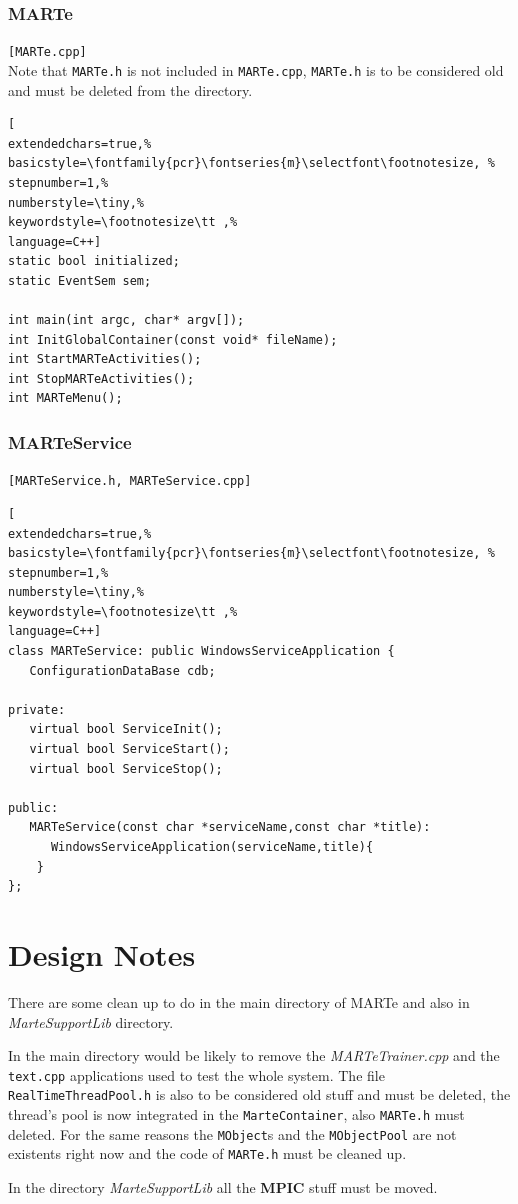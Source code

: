 \subsubsection{MARTe}
\texttt{[MARTe.cpp]}\\
Note that \texttt{MARTe.h} is not included in \texttt{MARTe.cpp}, \texttt{MARTe.h} is to be considered old and must be deleted from the directory.

\begin{lstlisting}[
extendedchars=true,%
basicstyle=\fontfamily{pcr}\fontseries{m}\selectfont\footnotesize, %
stepnumber=1,%
numberstyle=\tiny,%
keywordstyle=\footnotesize\tt ,%
language=C++]
static bool initialized;
static EventSem sem;

int main(int argc, char* argv[]);
int InitGlobalContainer(const void* fileName);
int StartMARTeActivities();
int StopMARTeActivities();
int MARTeMenu();
\end{lstlisting}



\subsubsection{MARTeService}
\texttt{[MARTeService.h, MARTeService.cpp]}\\

\begin{lstlisting}[
extendedchars=true,%
basicstyle=\fontfamily{pcr}\fontseries{m}\selectfont\footnotesize, %
stepnumber=1,%
numberstyle=\tiny,%
keywordstyle=\footnotesize\tt ,%
language=C++]
class MARTeService: public WindowsServiceApplication {
   ConfigurationDataBase cdb;

private:
   virtual bool ServiceInit();
   virtual bool ServiceStart();
   virtual bool ServiceStop();

public:
   MARTeService(const char *serviceName,const char *title):
      WindowsServiceApplication(serviceName,title){
    }
};
\end{lstlisting}



\section{Design Notes}
There are some clean up to do in the main directory of MARTe and also in \textit{MarteSupportLib} directory.

In the main directory would be likely to remove the \textit{MARTeTrainer.cpp} and the \texttt{text.cpp} applications used to test the whole system. The file \texttt{RealTimeThreadPool.h} is also to be considered old stuff and must be deleted, the thread's pool is now integrated in the \texttt{MarteContainer}, also \texttt{MARTe.h} must deleted. For the same reasons the \texttt{MObject}s and the \texttt{MObjectPool} are not existents right now and the code of \texttt{MARTe.h} must be cleaned up.

In the directory \textit{MarteSupportLib} all the \textbf{MPIC} stuff must be moved.


